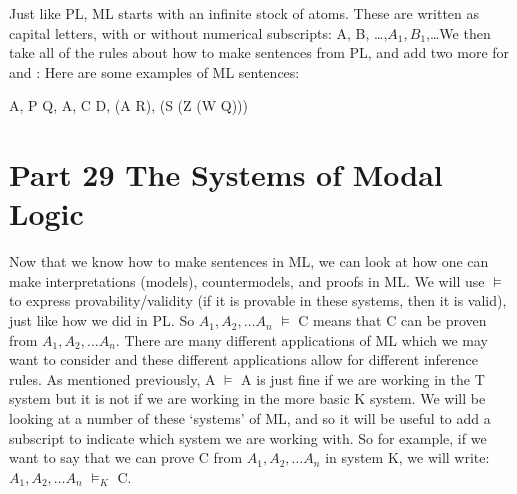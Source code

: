 Just like PL, ML starts with an infinite stock of atoms. These are written as capital letters, with or without numerical subscripts: A, B, \ldots,$ A_1, B_1$,\ldots We then take all of the rules about how to make sentences from PL, and add two more for \ebox  and \ediamond :
Here are some examples of ML sentences:
\begin{center}
A, P \eor  Q, \ebox A, C \eor  \ebox D, \ebox \ebox (A \eif  R), \ebox \ediamond (S \eand  (Z \eiff  (\ebox W \eor  \ediamond Q)))
\end{center}
\chapter{Part 29 The Systems of Modal Logic}
Now that we know how to make sentences in ML, we can look at how one can make interpretations (models), countermodels, and proofs in ML. We will use $\vDash$  to express provability/validity (if it is provable in these systems, then it is valid), just like how we did in PL. So $A_1,A_2,\ldots A_n$ $\vDash$  C means that C can be proven from $A_1,A_2,\ldots A_n$. There are many different applications of ML which we may want to consider and these different applications allow for different inference rules. As mentioned previously, \ebox A $\vDash$ A is just fine if we are working in the T system but it is not if we are working in the more basic K system. We will be looking at a number of these `systems' of ML, and so it will be useful to add a subscript to indicate which system we are working with. So for example, if we want to say that we can prove C from $A_1,A_2,\ldots A_n$ in system K, we will write: $A_1,A_2,\ldots A_n$ $\vDash_K$ C.

